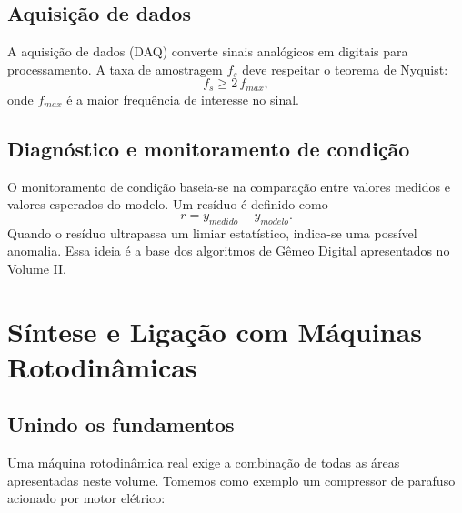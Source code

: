 \documentclass[12pt,a4paper]{article}
\numberwithin{equation}{section}
\numberwithin{table}{section}
\numberwithin{figure}{section}
\begin{document}
\subsection{Aquisição de dados}

A aquisição de dados (DAQ) converte sinais analógicos em digitais para
processamento. A taxa de amostragem $f_s$ deve respeitar o teorema de Nyquist:
\begin{equation}\label{eq:v1-c9-3}
f_s \geq 2\,f_{max},
\end{equation}
onde $f_{max}$ é a maior frequência de interesse no sinal.

\subsection{Diagnóstico e monitoramento de condição}

O monitoramento de condição baseia-se na comparação entre valores medidos e
valores esperados do modelo. Um resíduo é definido como
\begin{equation}\label{eq:v1-c9-4}
r = y_{medido} - y_{modelo}.
\end{equation}
Quando o resíduo ultrapassa um limiar estatístico, indica-se uma possível
anomalia. Essa ideia é a base dos algoritmos de Gêmeo Digital apresentados no
Volume II.


\section{Síntese e Ligação com Máquinas Rotodinâmicas}\label{sec:sintese}

\subsection{Unindo os fundamentos}

Uma máquina rotodinâmica real exige a combinação de todas as áreas apresentadas
neste volume. Tomemos como exemplo um compressor de parafuso acionado por motor
elétrico:
\end{document}
